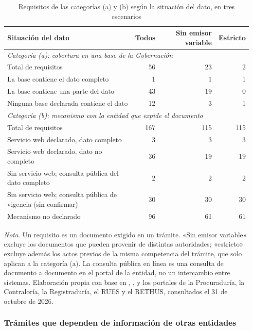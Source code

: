 \begin{table}[htbp]
\centering
\caption{Requisitos de las categorías (a) y (b) según la situación del dato, en tres escenarios}
\label{tab:cobertura}
\begin{tabular}{p{7.4cm}rrr}
\hline
Situación del dato & Todos & Sin emisor variable & Estricto \\
\hline
\multicolumn{4}{l}{\textit{Categoría (a): cobertura en una base de la Gobernación}} \\
\quad Total de requisitos & 56 & 23 & 2 \\
\quad La base contiene el dato completo & 1 & 1 & 1 \\
\quad La base contiene una parte del dato & 43 & 19 & 0 \\
\quad Ninguna base declarada contiene el dato & 12 & 3 & 1 \\
\multicolumn{4}{l}{\textit{Categoría (b): mecanismo con la entidad que expide el documento}} \\
\quad Total de requisitos & 167 & 115 & 115 \\
\quad Servicio web declarado, dato completo & 3 & 3 & 3 \\
\quad Servicio web declarado, dato no completo & 36 & 19 & 19 \\
\quad Sin servicio web; consulta pública del dato completo & 2 & 2 & 2 \\
\quad Sin servicio web; consulta pública de vigencia (sin confirmar) & 30 & 30 & 30 \\
\quad Mecanismo no declarado & 96 & 61 & 61 \\
\hline
\end{tabular}

\smallskip
\footnotesize\textit{Nota.} Un requisito es un documento exigido en un trámite. «Sin emisor variable» excluye los documentos que pueden provenir de distintas autoridades; «estricto» excluye además los actos previos de la misma competencia del trámite, que solo aplican a la categoría (a). La consulta pública en línea es una consulta de documento a documento en el portal de la entidad, no un intercambio entre sistemas. Elaboración propia con base en \textcite{gobernaciondelhuila2026datosmaestros}, \textcite{gobernaciondelhuila2026peti}, \textcite{funcionpublica2026visorsuit} y los portales de la Procuraduría, la Contraloría, la Registraduría, el RUES y el RETHUS, consultados el 31 de octubre de 2026.
\end{table}

\subsubsection{Trámites que dependen de información de otras entidades}


